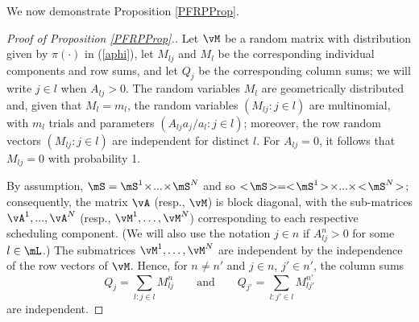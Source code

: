 \documentclass{amsart}
\begin{document}
We now demonstrate Proposition \ref{PFRPProp}.
\begin{proof}[Proof of Proposition \ref{PFRPProp}.]
\iffalse
This policy is first analyzed for its insensitivity property by \cite{BoPr03}.
The connection between product form queueing networks, Store-Forward and proportional fairness is detailed by \cite{Wa09}.
For $\vm=(m_{jl}:j\in\mJ, l\in\mL)\in\bZ_+^{\mJ\times\mL}$, we consider the product form distribution
\begin{equation}
\phi(\vm)\propto 
\prod_{l \in \mL} \left({{m}_l \choose {m}_{lj}: j\in\mJ}\prod_{\substack{j \in\mJ }} \left(\frac{A_{lj}a_j}{C_l}\right)^{{m}_{lj}}\right).
\end{equation}
Here we apply the convention $m_l:=\sum_{j\in\mJ} m_{jl}$, $l\in\mL$. In the above distribution, if $A_{lj}=0$ then $m_{jl}=0$. The key observation is that under this distribution, the values of $m_{jl}$ and $m_{j\rq{}l\rq{}}$ are given by independent random variables when $l\neq l\rq{}$. The Store-Forward policy the policy defined to achieve the stationary distribution
\begin{equation}\label{phiP}
P^{SF}(\vq)= \sum_{{{\vm}} \in U(\vecq)}  \phi(\vm).
\end{equation}
where $U(\vecq)=\{ \vm\in\bZ_+^{\mL\times\mJ} :  \sum_{l\in\mL} m_{lj} = q_j,\, j\in\mJ\}$. So $P^{SF}(\vecq)$ is the probability the sum $m_{lj}$ over $l$ is $q_j$. Thus can be achieved by an Whittle policy $\sigma^{SF}_j(\vecq)$ defined by a potential $\Phi(\vecq)=P^{SF}(\vecq)$. 
\fi

Let $\vM$ be a random matrix with distribution given by 
$\pi (\cdot)$ in (\ref{aphi}), let
$M_{lj}$ and $M_{l}$ be the corresponding individual components and row sums, and let
$Q_j$ be the corresponding column sums;
we will write $j\in l$ when $A_{lj} > 0$.
The random variables
$M_l$ are geometrically distributed and, given that $M_{l} =m_{l}$, the 
random variables $(M_{lj}: j\in l)$ are multinomial, with $m_l$ trials and parameters $(A_{lj}a_j/a_l : j\in l)$; moreover, the row random vectors $(M_{lj} : j\in l)$ are independent for distinct $l$. 
For $A_{lj}=0$, it follows that $M_{lj}=0$ with probability 1.

By assumption, $\mS= \mS^1\! \times\! ...\! \times\! \mS^N$ and so $<\! \mS \!>= <\! \mS^1\!>\!\times ... \times\! <\! \mS^N \!>$; 
consequently, the matrix $\vA$  (resp., $\vM$) is block diagonal, with the sub-matrices $\vA^1,...,\vA^N$ (resp., $ \vM^1,\ldots, \vM^N$) corresponding to each respective scheduling component. 
(We will also use the notation $j\in n$ if $A_{lj}^n > 0$ for some $l \in \mL$.)
The submatrices $\vM^1,\ldots, \vM^N$ are independent by the independence of the row vectors of $\vM$.
Hence, for $n\neq n'$ and $j\in n$, $j'\in n'$,  the column sums 
\begin{equation*}
Q_j = \sum_{l : j\in l} M_{lj}^n\qquad\text{and}\qquad Q_{j'} =\sum_{l : j'\in l} M_{lj'}^{n'}
\end{equation*}
are independent.


\end{proof}
\end{document}
